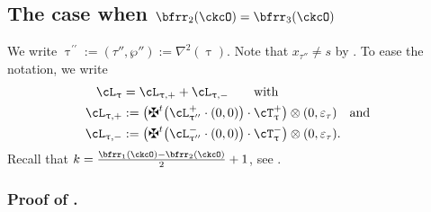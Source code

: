 \documentclass[12pt,a4paper]{amsart}
\newcommand{\trivial}[2][]{\if\relax\detokenize{#1}\relax
  {%
      \color{orange} \vspace{0em} $[$  #2 $]$
      \color{black}
  }
  \else
\ifx#1h
\ifcsname showtrivial\endcsname
{%
    \color{orange} \vspace{0em}  $[$ #2 $]$
    \color{black}
}
\fi
\else {\red Wrong argument!} \fi
\fi
}
\newcommand{\AC}{\mathrm{AC}}
\def\MYD{{\mathsf{MYD}}}
\def\DD{\nabla}
\numberwithin{equation}{section}
\theoremstyle{remark}
\def\uptaup{\uptau^{\prime}}
\def\uptaupp{\uptau^{\prime\prime}}
\begin{document}









\subsection*{The case when $\bfrr_{2}(\ckcO)=\bfrr_{3}(\ckcO)$}
\def\ppac#1{\cL_{#1,+}}
\def\nnac#1{\cL_{#1,-}}

We write $\uptaupp :=(\tau'',\wp''):= \DD^{2}(\uptau)$.
Note that $x_{\tau''}\neq s$ by .
To ease the notation, we write 
\begin{equation}
 \label{eq:BD4} 
  \begin{split}
    \ac_{\uptau} & = \ppac{\uptau} + \nnac{\uptau} \qquad \text{with} \\
  \ppac{\uptau} & := \left(\maltese^t \big(\pac{\uptaupp}\cdot (0,0)\big) \cdot \pcT_{\uptau}\right)\lotimes (0,\varepsilon_\tau) \AND \\
  \nnac{\uptau} & := \left(\maltese^t \big(\nac{\uptaupp}\cdot (0,0)\big) \cdot \ncT_{\uptau}\right)\lotimes (0,\varepsilon_\tau).
  \end{split}
\end{equation}
Recall that $k = \frac{\bfrr_1(\ckcO)-\bfrr_2(\ckcO)}{2}+1$, see . 

\subsubsection*{Proof of . }
\end{document}
